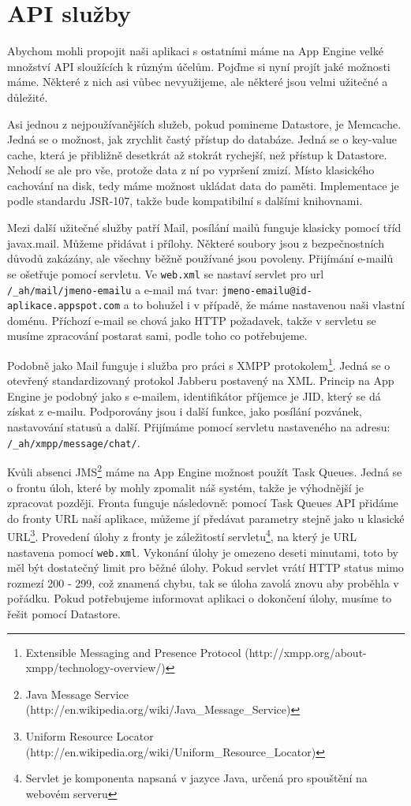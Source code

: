 \section{API služby}
Abychom mohli propojit naši aplikaci s ostatními máme na App Engine velké množství API sloužících k různým účelům. Pojďme si nyní projít jaké možnosti máme. Některé z nich asi vůbec nevyužijeme, ale některé jsou velmi užitečné a důležité.

Asi jednou z nejpoužívanějších služeb, pokud pomineme Datastore, je Memcache. Jedná se o možnost, jak zrychlit častý přístup do databáze. Jedná se o key-value cache, která je přibližně desetkrát až stokrát rychejší, než přístup k Datastore. Nehodí se ale pro vše, protože data z ní po vypršení zmizí. Místo klasického cachování na disk, tedy máme možnost ukládat data do paměti. Implementace je podle standardu JSR-107, takže bude kompatibilní s dalšími knihovnami.

Mezi další užitečné služby patří Mail, posílání mailů funguje klasicky pomocí tříd javax.mail. Můžeme přidávat i přílohy. Některé soubory jsou z bezpečnostních důvodů zakázány, ale všechny běžně používané jsou povoleny. Přijímání e-mailů se ošetřuje pomocí servletu. Ve \verb|web.xml| se nastaví servlet pro url \verb|/_ah/mail/jmeno-emailu| a e-mail má tvar: \verb|jmeno-emailu@id-aplikace.appspot.com| a to bohužel i v případě, že máme nastavenou naši vlastní doménu. Příchozí e-mail se chová jako HTTP požadavek, takže v servletu se musíme zpracování postarat sami, podle toho co potřebujeme. 

Podobně jako Mail funguje i služba pro práci s XMPP protokolem\footnote{Extensible Messaging and Presence Protocol (http://xmpp.org/about-xmpp/technology-overview/)}. Jedná se o otevřený standardizovaný protokol Jabberu postavený na XML. Princip na App Engine je podobný jako s e-mailem, identifikátor příjemce je JID, který se dá získat  z e-mailu. Podporovány jsou i další funkce, jako posílání pozvánek, nastavování statusů a další. Přijímáme pomocí servletu nastaveného na adresu: \verb|/_ah/xmpp/message/chat/|.

Kvůli absenci JMS\footnote{Java Message Service (http://en.wikipedia.org/wiki/Java\_Message\_Service)} máme na App Engine možnost použít Task Queues. Jedná se o frontu úloh, které by mohly zpomalit náš systém, takže je výhodnější je zpracovat později. Fronta funguje následovně: pomocí Task Queues API přidáme do fronty URL naší aplikace, můžeme jí předávat parametry stejně jako u klasické URL\footnote{Uniform Resource Locator (http://en.wikipedia.org/wiki/Uniform\_Resource\_Locator)}. Provedení úlohy z fronty je záležitostí servletu\footnote{Servlet je komponenta napsaná v jazyce Java, určená pro spouštění na webovém serveru}, na který je URL nastavena pomocí \verb|web.xml|. Vykonání úlohy je omezeno deseti minutami, toto by měl být dostatečný limit pro běžné úlohy. Pokud servlet vrátí HTTP status mimo rozmezí 200 - 299, což znamená chybu, tak se úloha zavolá znovu aby proběhla v pořádku. Pokud potřebujeme informovat aplikaci o dokončení úlohy, musíme to řešit pomocí Datastore.

